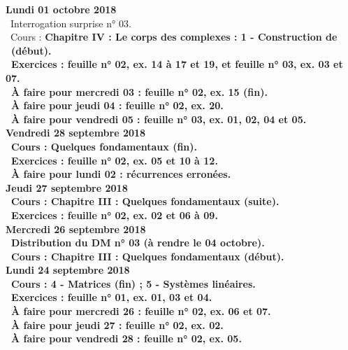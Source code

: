 \documentclass[12pt,a4paper]{article}
\begin{document}
\noindent\textbf{\bf Lundi 01 octobre 2018}\\
\bu\ Interrogation surprise n° 03.\\
\bu\ Cours : \bf Chapitre IV \rm : Le corps des complexes : 1 - Construction de \C\ (début).\\
\bu\ Exercices : feuille n° 02, ex. 14 à 17 et 19, et feuille n° 03, ex. 03 et 07.\\
\bu\ À faire pour mercredi 03 : feuille n° 02, ex. 15 (fin).\\
\bu\ À faire pour jeudi 04 : feuille n° 02, ex. 20.\\
\bu\ À faire pour vendredi 05 : feuille n° 03, ex. 01, 02, 04 et 05.\vspace{.4cm}\\ 

\noindent\textbf{Vendredi 28 septembre 2018}\\
\bu\ Cours : Quelques fondamentaux (fin).\\
\bu\ Exercices : feuille n° 02, ex. 05 et 10 à 12.\\
\bu\ À faire pour lundi 02 : récurrences erronées.\vspace{.4cm}\\

\noindent\textbf{Jeudi 27 septembre 2018}\\
\bu\ Cours : \bf Chapitre III \rm : Quelques fondamentaux (suite).\\
\bu\ Exercices : feuille n° 02, ex. 02 et 06 à 09.\vspace{.4cm}\\

\noindent\textbf{\bf Mercredi 26 septembre 2018}\\
\bu\ Distribution du DM n° 03 (à rendre le 04 octobre).\\
\bu\ Cours : \bf Chapitre III \rm : Quelques fondamentaux (début).\vspace{.4cm}\\

\noindent\textbf{\bf Lundi 24 septembre 2018}\\
\bu\ Cours : 4 - Matrices (fin) ; 5 - Systèmes linéaires.\\
\bu\ Exercices : feuille n° 01, ex. 01, 03 et 04.\\
\bu\ À faire pour mercredi 26 : feuille n° 02, ex. 06 et 07.\\
\bu\ À faire pour jeudi 27 : feuille n° 02, ex. 02.\\
\bu\ À faire pour vendredi 28 : feuille n° 02, ex. 05.\vspace{.4cm}\\ 
\end{document}
